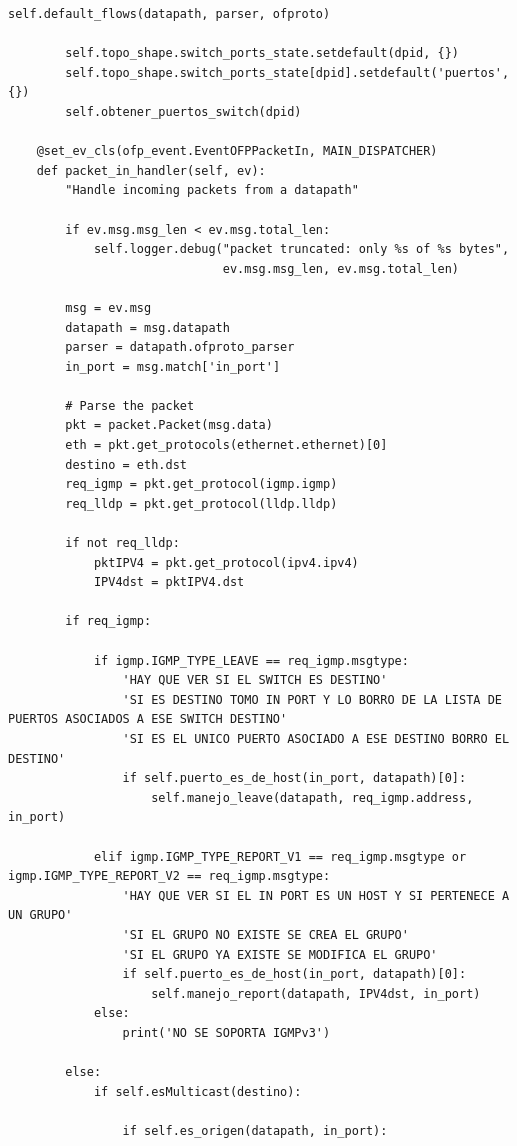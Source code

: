 \documentclass[12pt,a4paper,oneside]{book}
\begin{document}
\begin{lstlisting}[style=codigobase,  label = cod_correrP, caption= controlador.py]
        self.default_flows(datapath, parser, ofproto)

        self.topo_shape.switch_ports_state.setdefault(dpid, {})
        self.topo_shape.switch_ports_state[dpid].setdefault('puertos', {})
        self.obtener_puertos_switch(dpid)

    @set_ev_cls(ofp_event.EventOFPPacketIn, MAIN_DISPATCHER)
    def packet_in_handler(self, ev):
        "Handle incoming packets from a datapath"

        if ev.msg.msg_len < ev.msg.total_len:
            self.logger.debug("packet truncated: only %s of %s bytes",
                              ev.msg.msg_len, ev.msg.total_len)

        msg = ev.msg
        datapath = msg.datapath
        parser = datapath.ofproto_parser
        in_port = msg.match['in_port']

        # Parse the packet
        pkt = packet.Packet(msg.data)
        eth = pkt.get_protocols(ethernet.ethernet)[0]
        destino = eth.dst
        req_igmp = pkt.get_protocol(igmp.igmp)
        req_lldp = pkt.get_protocol(lldp.lldp)

        if not req_lldp:
            pktIPV4 = pkt.get_protocol(ipv4.ipv4)
            IPV4dst = pktIPV4.dst

        if req_igmp:

            if igmp.IGMP_TYPE_LEAVE == req_igmp.msgtype:
                'HAY QUE VER SI EL SWITCH ES DESTINO'
                'SI ES DESTINO TOMO IN PORT Y LO BORRO DE LA LISTA DE PUERTOS ASOCIADOS A ESE SWITCH DESTINO'
                'SI ES EL UNICO PUERTO ASOCIADO A ESE DESTINO BORRO EL DESTINO'
                if self.puerto_es_de_host(in_port, datapath)[0]:
                    self.manejo_leave(datapath, req_igmp.address, in_port)

            elif igmp.IGMP_TYPE_REPORT_V1 == req_igmp.msgtype or igmp.IGMP_TYPE_REPORT_V2 == req_igmp.msgtype:
                'HAY QUE VER SI EL IN PORT ES UN HOST Y SI PERTENECE A UN GRUPO'
                'SI EL GRUPO NO EXISTE SE CREA EL GRUPO'
                'SI EL GRUPO YA EXISTE SE MODIFICA EL GRUPO'
                if self.puerto_es_de_host(in_port, datapath)[0]:
                    self.manejo_report(datapath, IPV4dst, in_port)
            else:
                print('NO SE SOPORTA IGMPv3')

        else:
            if self.esMulticast(destino):

                if self.es_origen(datapath, in_port):


\end{lstlisting}
\end{document}

